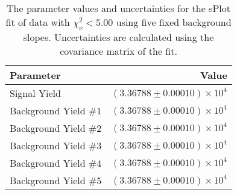 
\begin{table}[h]
    \begin{center}
        \begin{tabular}{lr}\toprule
            Parameter & Value \\\midrule
            Signal Yield & $(3.36788 \pm 0.00010) \times 10^{4}$ \\
            Background Yield $\#1$ & $(3.36788 \pm 0.00010) \times 10^{4}$ \\
            Background Yield $\#2$ & $(3.36788 \pm 0.00010) \times 10^{4}$ \\
            Background Yield $\#3$ & $(3.36788 \pm 0.00010) \times 10^{4}$ \\
            Background Yield $\#4$ & $(3.36788 \pm 0.00010) \times 10^{4}$ \\
            Background Yield $\#5$ & $(3.36788 \pm 0.00010) \times 10^{4}$ \\\bottomrule
        \end{tabular}
        \caption{The parameter values and uncertainties for the sPlot fit of data with $\chi^2_\nu < 5.00$ using five fixed background slopes. Uncertainties are calculated using the covariance matrix of the fit.}
    \end{center}
\end{table}

